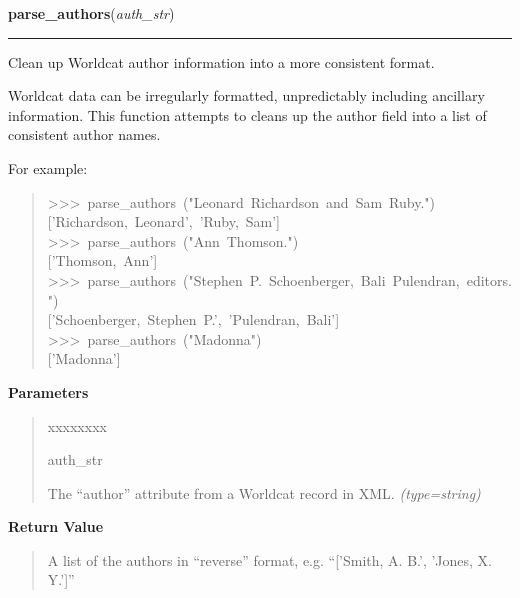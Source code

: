 \hspace{.8\funcindent}\begin{boxedminipage}{\funcwidth}

    \raggedright \textbf{parse\_authors}(\textit{auth\_str})

    \vspace{-1.5ex}

    \rule{\textwidth}{0.5\fboxrule}
\setlength{\parskip}{2ex}

Clean up Worldcat author information into a more consistent format.

Worldcat data can be irregularly formatted, unpredictably including
ancillary information. This function attempts to cleans up the author field
into a list of consistent author names.

For example:
\begin{quote}{\ttfamily \raggedright \noindent
>{}>{}>~parse{\_}authors~("Leonard~Richardson~and~Sam~Ruby.")~\\
{[}'Richardson,~Leonard',~'Ruby,~Sam'{]}~\\
>{}>{}>~parse{\_}authors~("Ann~Thomson.")~\\
{[}'Thomson,~Ann'{]}~\\
>{}>{}>~parse{\_}authors~("Stephen~P.~Schoenberger,~Bali~Pulendran,~editors.")~\\
{[}'Schoenberger,~Stephen~P.',~'Pulendran,~Bali'{]}~\\
>{}>{}>~parse{\_}authors~("Madonna")~\\
{[}'Madonna'{]}
}\end{quote}
\setlength{\parskip}{1ex}
      \textbf{Parameters}
      \vspace{-1ex}

      \begin{quote}
        \begin{Ventry}{xxxxxxxx}

          \item[auth\_str]


The ``author'' attribute from a Worldcat record in XML.
            {\it (type=string)}

        \end{Ventry}

      \end{quote}

      \textbf{Return Value}
    \vspace{-1ex}

      \begin{quote}

A list of the authors in ``reverse'' format, e.g. ``{[}'Smith, A. B.',
'Jones, X. Y.'{]}''
      \end{quote}

    \end{boxedminipage}

